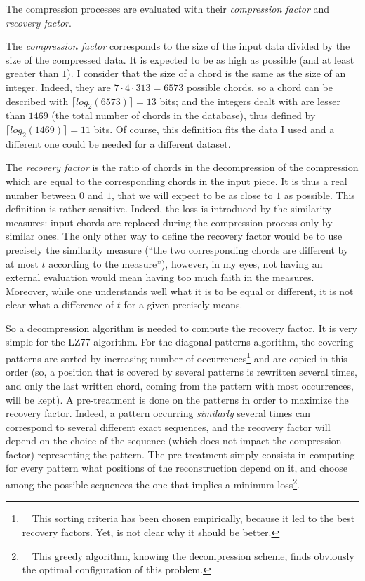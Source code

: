 \documentclass[a4paper,10pt]{article}
\newcommand{\guill}[1]{“#1”}
\begin{document}
The compression processes are evaluated with their \emph{compression factor} and \emph{recovery factor}.

The \emph{compression factor} corresponds to the size of the input data divided by the size of the compressed data. It is expected to be as high as possible (and at least greater than $1$). I consider that the size of a chord is the same as the size of an integer. Indeed, they are $7\cdot4\cdot313=6573$ possible chords, so a chord can be described with $\lceil log_2(6573)\rceil = 13$ bits; and the integers dealt with are lesser than $1469$ (the total number of chords in the database), thus defined by $\lceil log_2(1469)\rceil = 11$ bits. Of course, this definition fits the data I used and a different one could be needed for a different dataset.

The \emph{recovery factor} is the ratio of chords in the decompression of the compression which are equal to the corresponding chords in the input piece. It is thus a real number between $0$ and $1$, that we will expect to be as close to $1$ as possible. This definition is rather sensitive. Indeed, the loss is introduced by the similarity measures: input chords are replaced during the compression process only by similar ones. The only other way to define the recovery factor would be to use precisely the similarity measure (\guill{the two corresponding chords are different by at most $t$ according to the measure}), however, in my eyes, not having an external evaluation would mean having too much faith in the measures. Moreover, while one understands well what it is to be equal or different, it is not clear what a difference of $t$ for a given precisely means.

So a decompression algorithm is needed to compute the recovery factor. It is very simple for the LZ77 algorithm. For the diagonal patterns algorithm, the covering patterns are sorted by increasing number of occurrences\footnote{~~This sorting criteria has been chosen empirically, because it led to the best recovery factors. Yet, is not clear why it should be better.} and are copied in this order (so, a position that is covered by several patterns is rewritten several times, and only the last written chord, coming from the pattern with most occurrences, will be kept). A pre-treatment is done on the patterns in order to maximize the recovery factor. Indeed, a pattern occurring \emph{similarly} several times can correspond to several different exact sequences, and the recovery factor will depend on the choice of the sequence (which does not impact the compression factor) representing the pattern. The pre-treatment simply consists in computing for every pattern what positions of the reconstruction depend on it, and choose among the possible sequences the one that implies a minimum loss\footnote{~~This greedy algorithm, knowing the decompression scheme, finds obviously the optimal configuration of this problem.}.
\end{document}
